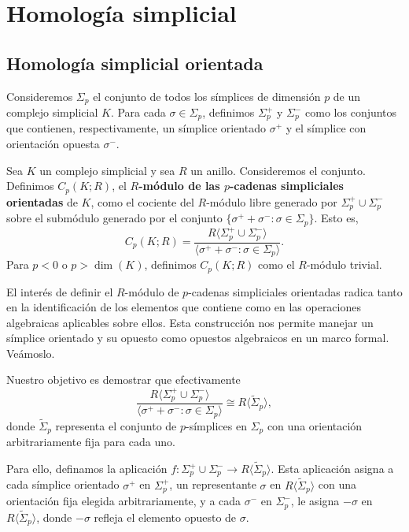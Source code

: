 
\chapter{Homología simplicial}

\section{Homología simplicial orientada}
Consideremos \(\Sigma_p\) el conjunto de todos los símplices de dimensión $p$ de un complejo simplicial \(K\). Para cada \(\sigma \in \Sigma_p\), definimos \(\Sigma_p^+\) y \(\Sigma_p^-\) como los conjuntos que contienen, respectivamente, un símplice orientado \(\sigma^+\) y el símplice con orientación opuesta \(\sigma^-\).
\begin{definicion}
	Sea \(K\) un complejo simplicial y sea \(R\) un anillo. Consideremos el conjunto.
	Definimos \(C_p(K;R)\), el \textbf{\(R\)-módulo de las \(p\)-cadenas simpliciales orientadas} de \(K\), como el cociente del \(R\)-módulo libre generado por $\Sigma_p^+ \cup \Sigma_p^-$ sobre el submódulo generado por el conjunto $\{\sigma^+ + \sigma^- : \sigma \in \Sigma_p\}$. Esto es,
	\[ 
	C_p(K;R) = \frac{R\langle \Sigma_p^+ \cup \Sigma_p^- \rangle}{\langle \sigma^+ + \sigma^- : \sigma \in \Sigma_p \rangle}. 
	\]
	Para \(p < 0\) o \(p > \dim(K)\), definimos \(C_p(K;R)\) como el \(R\)-módulo trivial.
\end{definicion}
El interés de definir el \(R\)-módulo de \(p\)-cadenas simpliciales orientadas radica tanto en la identificación de los elementos que contiene como en las operaciones algebraicas aplicables sobre ellos. Esta construcción nos permite manejar un símplice orientado y su opuesto como opuestos algebraicos en un marco formal. Veámoslo.

Nuestro objetivo es demostrar que efectivamente
\[
\frac{R\langle \Sigma_p^+ \cup \Sigma_p^- \rangle}{\langle \sigma^+ + \sigma^- : \sigma \in \Sigma_p \rangle} \cong R \langle \tilde{\Sigma}_p \rangle,
\]
donde \(\tilde{\Sigma}_p\) representa el conjunto de \(p\)-símplices en \(\Sigma_p\) con una orientación arbitrariamente fija para cada uno.

Para ello, definamos la aplicación \(f : \Sigma^+_p \cup \Sigma^-_p \to R \langle \tilde{\Sigma}_p \rangle\). Esta aplicación asigna a cada símplice orientado \(\sigma^+\) en \(\Sigma_p^+\), un representante \(\sigma\) en \(R \langle \tilde{\Sigma}_p \rangle\) con una orientación fija elegida arbitrariamente, y a cada \(\sigma^-\) en \(\Sigma_p^-\), le asigna \(-\sigma\) en \(R \langle \tilde{\Sigma}_p \rangle\), donde \(-\sigma\) refleja el elemento opuesto de $\sigma$. 


